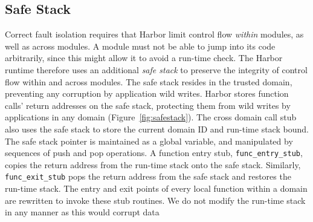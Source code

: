 \subsection{Safe Stack}
\label{subsec:safe_stack}
%
Correct fault isolation requires that Harbor limit control flow
\emph{within} modules, as well as across modules.
%
A module must not be able to jump into its code arbitrarily, since this
might allow it to avoid a run-time check.
%
The Harbor runtime therefore uses an additional \emph{safe stack}
to preserve the integrity of control flow within and across modules.
%
The safe stack resides in the
trusted domain, preventing any corruption by application wild writes.
%
%
%
Harbor stores function calls' return addresses on the safe stack,
protecting them from wild writes by applications in any domain
(Figure~\ref{fig:safestack}).
%
The cross domain call stub also uses the safe stack to store the current
domain ID and run-time stack bound.
%
The safe stack pointer is maintained as a global variable, and manipulated
by sequences of push and pop operations.
%
%
%
%
%
%
%
A function entry stub, \texttt{func\_entry\_stub}, copies the return
address from the run-time stack onto the safe stack.
%
Similarly, \texttt{func\_exit\_stub} pops the return address from
the safe stack and restores the run-time stack.
%
The entry and exit points of every local function within a domain are
rewritten to invoke these stub routines.
%
%
%
We do not modify the run-time stack in any manner as this would corrupt data
